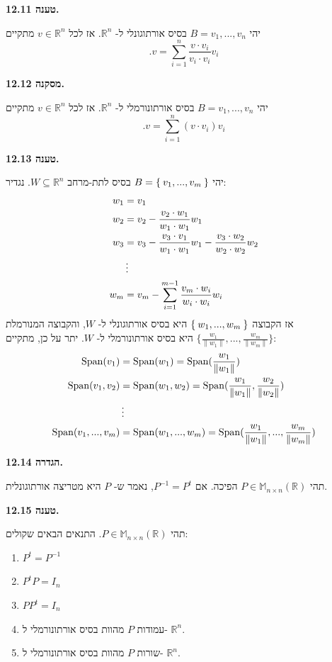 \documentclass[12pt]{report}
\theoremstyle{plain}
\theoremstyle{definition}
\newcommand{\R}{\mathbb{R}}
\newcommand{\M}{\mathbb{M}}
\newcommand{\0}{\mathbf{0}}
\DeclareMathOperator{\Span}{Span}
\begin{document}
\noindent\textbf{טענה 12.11.}

יהי 
$B={v_1,...,v_n}$
בסיס אורתוגונלי ל-
$\R^n$.
אז לכל
$v\in\R^n$
מתקיים
$$
.v=\sum_{i=1}^n\frac{v\cdot v_i}{v_i\cdot v_i}v_i
$$
\bigskip
\bigskip

\noindent\textbf{מסקנה 12.12.}

יהי 
$B={v_1,...,v_n}$
בסיס אורתונורמלי ל-
$\R^n$.
אז לכל
$v\in\R^n$
מתקיים
$$
.v=\sum_{i=1}^n(v\cdot v_i)v_i
$$
\bigskip
\bigskip

\noindent\textbf{טענה 12.13.}

יהי
$B=\Set{v_1,...,v_m}$
בסיס לתת-מרחב
$W\subseteq \R^n$.
נגדיר:
$$ 
\begin{aligned} w_1&=v_1 \\ 
w_2&=v_2-\frac{v_2\cdot w_1}{w_1\cdot w_1}w_1 \\ 
w_3&=v_3-\frac{v_3\cdot v_1}{w_1\cdot w_1}w_1-\frac{v_3\cdot w_2}{w_2\cdot w_2}w_2\\ 
&\thinspace \vdots \\ 
w_m&=v_m-\sum_{i=1}^{m-1}\frac{v_m\cdot w_i}{w_i\cdot w_i}w_i 
\end{aligned}
$$
אז הקבוצה
$\Set{w_1,...,w_m}$
היא בסיס אורתוגונלי ל-
$W$,
והקבוצה המנורמלת
$\{\frac{w_1}{\|w_1\|},...,\frac{w_m}{\|w_m\|}\}$
היא בסיס אורתונורמלי ל-
$W$.
יתר על כן, מתקיים:
$$ 
\begin{aligned} 
\Span(v_1)&=\Span(w_1)=\Span(\frac{w_1}{\|w_1\|}) \\ \Span(v_1,v_2)&=\Span(w_1,w_2)=\Span(\frac{w_1}{\|w_1\|},\frac{w_2}{\|w_2\|}) \\ &\thinspace\vdots \\ \Span(v_1,...,v_m)&=\Span(w_1,...,w_m)=\Span(\frac{w_1}{\|w_1\|},...,\frac{w_m}{\|w_m\|}) \end{aligned} 
$$
\bigskip
\bigskip

\noindent\textbf{הגדרה 12.14.}

תהי
$P\in\M_{n\times n}(\R)$
הפיכה. אם
$P^{-1}=P^t$,
נאמר ש-
$P$
היא מטריצה אורתוגונלית.
\bigskip
\bigskip

\noindent\textbf{טענה 12.15.}

תהי 
$P\in\M_{n\times n}(\R)$.
התנאים הבאים שקולים:

\begin{enumerate}[label=\alph*.]
\item 
$P^t=P^{-1}$


\item 
$P^tP=I_n$


\item 
$PP^t=I_n$


\item 
עמודות
$P$
מהוות בסיס אורתונורמלי ל-
$\R^n$.


\item 
שורות
$P$
מהוות בסיס אורתונורמלי ל-
$\R^n$.


\end{enumerate}
\bigskip
\bigskip
\end{document}
